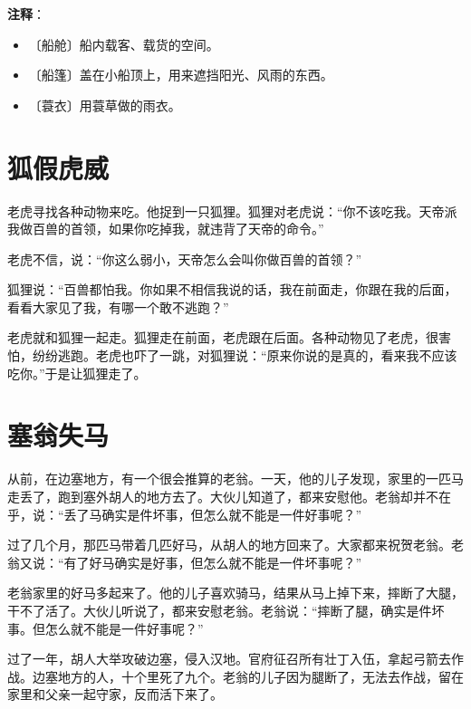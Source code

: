 \documentclass[12pt,UTF-8,openany]{ctexbook}
\begin{document}
\newpage

\textbf{注释}：

\vspace{-1em}

\begin{itemize}
    \setlength\itemsep{-0.2em}
    \item 〔船舱〕船内载客、载货的空间。
    \item 〔船篷〕盖在小船顶上，用来遮挡阳光、风雨的东西。
    \item 〔蓑衣〕用蓑草做的雨衣。
\end{itemize}

\chapter{狐假虎威}

\begin{Large}
    
    老虎寻找各种动物来吃。他捉到一只狐狸。狐狸对老虎说：“你不该吃我。天帝派我做百兽的首领，如果你吃掉我，就违背了天帝的命令。”
    
    老虎不信，说：“你这么弱小，天帝怎么会叫你做百兽的首领？”
    
    狐狸说：“百兽都怕我。你如果不相信我说的话，我在前面走，你跟在我的后面，看看大家见了我，有哪一个敢不逃跑？”
    
    老虎就和狐狸一起走。狐狸走在前面，老虎跟在后面。各种动物见了老虎，很害怕，纷纷逃跑。老虎也吓了一跳，对狐狸说：“原来你说的是真的，看来我不应该吃你。”于是让狐狸走了。
    
\end{Large}

\chapter{塞翁失马}

\begin{Large}
    
    从前，在边塞地方，有一个很会推算的老翁。一天，他的儿子发现，家里的一匹马走丢了，跑到塞外胡人的地方去了。大伙儿知道了，都来安慰他。老翁却并不在乎，说：“丢了马确实是件坏事，但怎么就不能是一件好事呢？”
    
    过了几个月，那匹马带着几匹好马，从胡人的地方回来了。大家都来祝贺老翁。老翁又说：“有了好马确实是好事，但怎么就不能是一件坏事呢？”
    
    老翁家里的好马多起来了。他的儿子喜欢骑马，结果从马上掉下来，摔断了大腿，干不了活了。大伙儿听说了，都来安慰老翁。老翁说：“摔断了腿，确实是件坏事。但怎么就不能是一件好事呢？”
    
    过了一年，胡人大举攻破边塞，侵入汉地。官府征召所有壮丁入伍，拿起弓箭去作战。边塞地方的人，十个里死了九个。老翁的儿子因为腿断了，无法去作战，留在家里和父亲一起守家，反而活下来了。
    
\end{Large}
\end{document}
